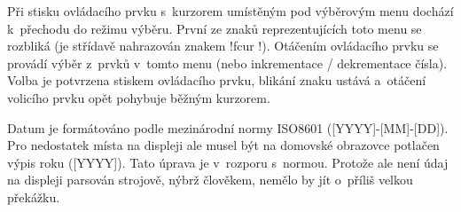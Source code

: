 Při stisku ovládacího prvku s~kurzorem umístěným pod výběrovým menu dochází
k~přechodu do režimu výběru. První ze znaků reprezentujících toto menu se
rozbliká (je střídavě nahrazován znakem !{fcur} !). Otáčením
ovládacího prvku se provádí výběr z~prvků v~tomto menu (nebo inkrementace /
dekrementace čísla). Volba je potvrzena stiskem ovládacího prvku, blikání znaku
ustává a~otáčení volicího prvku opět pohybuje běžným kurzorem.

Datum je formátováno podle mezinárodní normy ISO8601 ([YYYY]-[MM]-[DD]).
Pro nedostatek místa na displeji ale musel být na domovské obrazovce potlačen
výpis roku ([YYYY]). Tato úprava je v~rozporu s~normou. Protože ale není údaj
na displeji parsován strojově, nýbrž člověkem, nemělo by jít o~příliš velkou
překážku.

\begingroup
